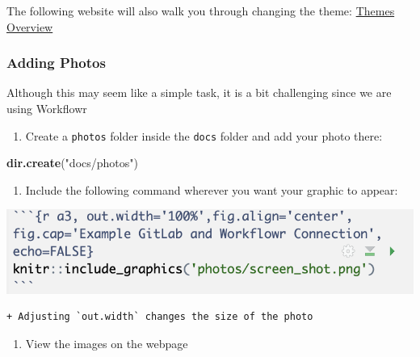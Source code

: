 \documentclass[openany]{book}
\newenvironment{Shaded}{\begin{snugshade}}{\end{snugshade}}
\newcommand{\KeywordTok}[1]{\textcolor[rgb]{0.13,0.29,0.53}{\textbf{#1}}}
\newcommand{\NormalTok}[1]{#1}
\newcommand{\StringTok}[1]{\textcolor[rgb]{0.31,0.60,0.02}{#1}}
\providecommand{\tightlist}{%
  \setlength{\itemsep}{0pt}\setlength{\parskip}{0pt}}
\begin{document}
The following website will also walk you through changing the theme: \href{https://jdblischak.github.io/workflowr/articles/wflow-02-customization.html\#changing-the-theme}{Themes Overview}

\hypertarget{adding-photos}{%
\subsubsection{Adding Photos}\label{adding-photos}}

Although this may seem like a simple task, it is a bit challenging since we are using Workflowr

\begin{enumerate}
\def\labelenumi{\arabic{enumi}.}
\tightlist
\item
  Create a \texttt{photos} folder inside the \texttt{docs} folder and add your photo there:
\end{enumerate}

\begin{Shaded}
\begin{Highlighting}[]
\KeywordTok{dir.create}\NormalTok{(}\StringTok{"docs/photos"}\NormalTok{)}
\end{Highlighting}
\end{Shaded}

\begin{enumerate}
\def\labelenumi{\arabic{enumi}.}
\setcounter{enumi}{1}
\tightlist
\item
  Include the following command wherever you want your graphic to appear:
\end{enumerate}

\begin{flushleft}\includegraphics[width=0.5\linewidth]{images/Workflow_Photos/photoExample} \end{flushleft}

\begin{verbatim}
+ Adjusting `out.width` changes the size of the photo
\end{verbatim}

\begin{enumerate}
\def\labelenumi{\arabic{enumi}.}
\setcounter{enumi}{2}
\tightlist
\item
  View the images on the webpage
\end{enumerate}
\end{document}
